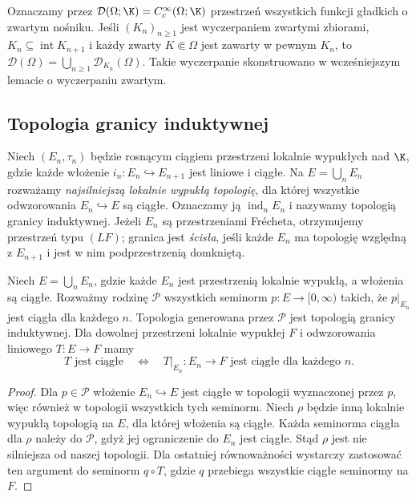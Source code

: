 \begin{definicja}
\label{def:D-algebraic18}
Oznaczamy przez $\mathcal D(\Omega;\K)=C_c^\infty(\Omega;\K)$
przestrzeń wszystkich funkcji gładkich o zwartym nośniku.
Jeśli $(K_n)_{n\ge1}$ jest wyczerpaniem zwartymi zbiorami,
$K_n\subseteq\operatorname{int}K_{n+1}$ i każdy zwarty
$K\Subset\Omega$ jest zawarty w pewnym $K_n$, to
$\mathcal D(\Omega)=\bigcup_{n\ge1}\mathcal D_{K_n}(\Omega)$.
Takie wyczerpanie skonstruowano w
wcześniejszym lemacie o wyczerpaniu zwartym.
\end{definicja}

\subsection{Topologia granicy induktywnej}

\begin{definicja}
\label{def:LF18}
Niech $(E_n,\tau_n)$ będzie rosnącym ciągiem przestrzeni
lokalnie wypukłych nad $\K$, gdzie każde włożenie
$i_n:E_n\hookrightarrow E_{n+1}$ jest liniowe i ciągłe.
Na $E=\bigcup_nE_n$ rozważamy \emph{najsilniejszą lokalnie
wypukłą topologię}, dla której wszystkie odwzorowania
$E_n\hookrightarrow E$ są ciągłe. Oznaczamy ją
$\operatorname{ind}_n E_n$ i nazywamy topologią granicy induktywnej.
Jeżeli $E_n$ są przestrzeniami Fr\'echeta, otrzymujemy
przestrzeń typu $(LF)$; granica jest \emph{ścisła}, jeśli
każde $E_n$ ma topologię względną z $E_{n+1}$ i jest w nim
podprzestrzenią domkniętą.
\end{definicja}

\begin{twierdzenie}
\label{thm:LF-universal18}
Niech $E=\bigcup_nE_n$, gdzie każde $E_n$ jest przestrzenią
lokalnie wypukłą, a włożenia są ciągłe. Rozważmy rodzinę
$\mathcal P$ wszystkich seminorm $p:E\to[0,\infty)$ takich,
że $p|_{E_n}$ jest ciągła dla każdego $n$.
Topologia generowana przez $\mathcal P$ jest topologią
granicy induktywnej. Dla dowolnej przestrzeni lokalnie
wypukłej $F$ i odwzorowania liniowego $T:E\to F$ mamy
\[
 T\text{ jest ciągłe}\quad\Longleftrightarrow\quad
 T|_{E_n}:E_n\to F\text{ jest ciągłe dla każdego }n.
\]
\end{twierdzenie}
\begin{proof}
Dla $p\in\mathcal P$ włożenie $E_n\hookrightarrow E$ jest
ciągłe w topologii wyznaczonej przez $p$, więc również
w topologii wszystkich tych seminorm. Niech $\rho$ będzie
inną lokalnie wypukłą topologią na $E$, dla której włożenia
są ciągłe. Każda seminorma ciągła dla $\rho$ należy do
$\mathcal P$, gdyż jej ograniczenie do $E_n$ jest ciągłe.
Stąd $\rho$ jest nie silniejsza od naszej topologii.
Dla ostatniej równoważności wystarczy zastosować ten
argument do seminorm $q\circ T$, gdzie $q$ przebiega
wszystkie ciągłe seminormy na $F$.
\end{proof}

